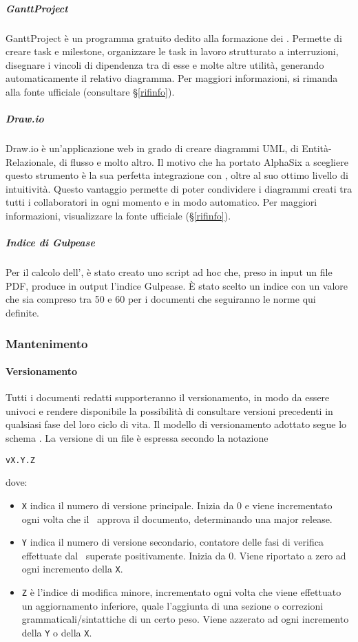 			\subparagraph{GanttProject} %
			GanttProject è un programma gratuito dedito alla formazione dei . Permette di creare task e milestone, organizzare le task
			in lavoro strutturato a interruzioni, disegnare i vincoli di dipendenza tra di esse e molte altre utilità, generando automaticamente il relativo diagramma.
			Per maggiori informazioni, si rimanda alla fonte ufficiale (consultare \S\ref{rifinfo}).

			\subparagraph{Draw.io}
			Draw.io è un'applicazione web in grado di creare diagrammi UML, di Entità-Relazionale, di flusso e molto altro. Il motivo che ha portato AlphaSix a scegliere
			questo strumento è la sua perfetta integrazione con , oltre al suo ottimo livello di intuitività. Questo vantaggio permette
			di poter condividere i diagrammi creati tra tutti i collaboratori in ogni momento e in modo automatico.
			Per maggiori informazioni, visualizzare la fonte ufficiale (\S\ref{rifinfo}).

			\subparagraph{Indice di Gulpease}
			Per il calcolo dell', è stato creato uno script ad hoc che, preso in input un file PDF, produce in output l'indice Gulpease.
			È stato scelto un indice con un valore che sia compreso tra 50 e 60 per i documenti che seguiranno le norme qui definite.

		\subsubsection{Mantenimento}

			\paragraph{Versionamento} \label{Versionamento}
			Tutti i documenti redatti supporteranno il versionamento, in modo da essere univoci e rendere disponibile la possibilità di consultare versioni precedenti
			in qualsiasi fase del loro ciclo di vita.
			Il modello di versionamento adottato segue lo schema . La versione di un file è espressa secondo la notazione
			\begin{center}
				\texttt{vX.Y.Z}
			\end{center}
			\indent dove:
			\begin{itemize}
				\item \texttt{X} indica il numero di versione principale. Inizia da 0 e viene incrementato ogni volta che il \Res\ approva il documento, determinando
					una major release.
				\item \texttt{Y} indica il numero di versione secondario, contatore delle fasi di verifica effettuate dal \Ver\ superate positivamente. Inizia da 0.
					Viene riportato a zero ad ogni incremento della \texttt{X}.
				\item \texttt{Z} è l'indice di modifica minore, incrementato ogni volta che viene effettuato un aggiornamento inferiore, quale l'aggiunta di una sezione
					o correzioni grammaticali/sintattiche di un certo peso. Viene azzerato ad ogni incremento della \texttt{Y} o della \texttt{X}.
			\end{itemize}

